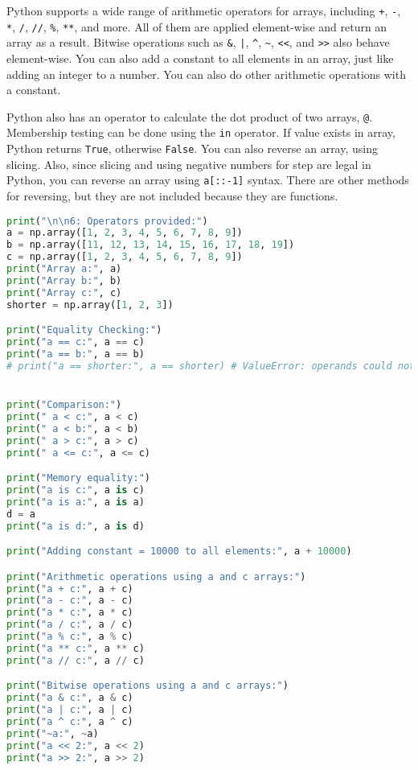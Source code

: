 \documentclass{article}
\begin{document}
\begin{itemize}
Python supports a wide range of arithmetic operators for arrays, including \texttt{+}, \texttt{-}, \texttt{*}, \texttt{/}, \texttt{//}, \texttt{\%}, \texttt{**}, and more. All of them are applied element-wise and return an array as a result. Bitwise operations such as \texttt{\&}, \texttt{|}, \texttt{\textasciicircum}, \texttt{\textasciitilde}, \texttt{<<}, and \texttt{>>} also behave element-wise. You can also add a constant to all elements in an array, just like adding an integer to a number. You can also do other arithmetic operations with a constant. 


Python also has an operator to calculate the dot product of two arrays, \texttt{@}.
Membership testing can be done using the \texttt{in} operator. If value exists in array, Python returns \texttt{True}, otherwise \texttt{False}.
You can also reverse an array, using slicing.
Also, since slicing and using negative numbers for step are legal in Python, you can reverse an array using \texttt{a[::-1]} syntax. There are other methods for reversing, but they are not included because they are functions.


\begin{lstlisting}[language=Python]
print("\n\n6: Operators provided:")
a = np.array([1, 2, 3, 4, 5, 6, 7, 8, 9])
b = np.array([11, 12, 13, 14, 15, 16, 17, 18, 19])
c = np.array([1, 2, 3, 4, 5, 6, 7, 8, 9])
print("Array a:", a)
print("Array b:", b)
print("Array c:", c)
shorter = np.array([1, 2, 3])

print("Equality Checking:")
print("a == c:", a == c)
print("a == b:", a == b)
# print("a == shorter:", a == shorter) # ValueError: operands could not be broadcast together with shapes (9,) (3,)


print("Comparison:")
print(" a < c:", a < c)
print(" a < b:", a < b)
print(" a > c:", a > c)
print(" a <= c:", a <= c)

print("Memory equality:")
print("a is c:", a is c)
print("a is a:", a is a) 
d = a
print("a is d:", a is d)

print("Adding constant = 10000 to all elements:", a + 10000)

print("Arithmetic operations using a and c arrays:")
print("a + c:", a + c)       
print("a - c:", a - c) 
print("a * c:", a * c)
print("a / c:", a / c)
print("a % c:", a % c)
print("a ** c:", a ** c)
print("a // c:", a // c)

print("Bitwise operations using a and c arrays:")
print("a & c:", a & c)
print("a | c:", a | c)
print("a ^ c:", a ^ c)
print("~a:", ~a) 
print("a << 2:", a << 2) 
print("a >> 2:", a >> 2) 


\end{lstlisting}
\end{itemize}
\end{document}

